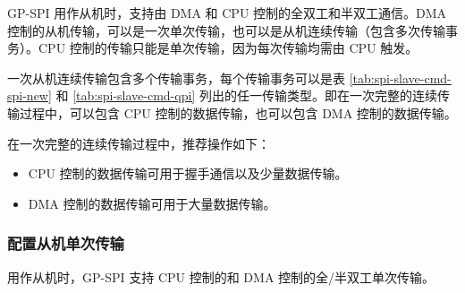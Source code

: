 \documentclass[main\_\_CN.tex]{subfiles}
\begin{document}
GP-SPI 用作从机时，支持由 DMA 和 CPU 控制的全双工和半双工通信。DMA 控制的从机传输，可以是一次单次传输，也可以是从机连续传输（包含多次传输事务）。CPU 控制的传输只能是单次传输，因为每次传输均需由 CPU 触发。

一次从机连续传输包含多个传输事务，每个传输事务可以是表 \ref{tab:spi-slave-cmd-spi-new} 和 \ref{tab:spi-slave-cmd-qpi} 列出的任一传输类型。即在一次完整的连续传输过程中，可以包含 CPU 控制的数据传输，也可以包含 DMA 控制的数据传输。 

在一次完整的连续传输过程中，推荐操作如下：

\begin{itemize}
    \item CPU 控制的数据传输可用于握手通信以及少量数据传输。
    \item DMA 控制的数据传输可用于大量数据传输。
\end{itemize}


\subsubsection{配置从机单次传输}\label{GP-SPI2 slave single transfer}

用作从机时，GP-SPI 支持 CPU 控制的和 DMA 控制的全/半双工单次传输。
\end{document}
